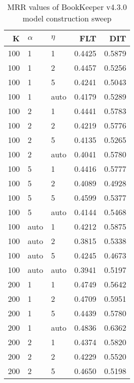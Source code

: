
\begin{table}
\begin{spacing}{1.2}
\centering
\caption{MRR values of BookKeeper v4.3.0 model construction sweep}
\label{table:bookkeeper_model_sweep}
\vspace{0.2em}
\parbox{.45\linewidth}{\centering \begin{tabular}{rll|rr}
\toprule
   K & $\alpha$ &   $\eta$ & FLT & DIT \\
\midrule
 100 &     1 &     1 &           0.4425 & 0.5879 \\
 100 &     1 &     2 &           0.4457 & 0.5256 \\
 100 &     1 &     5 &           0.4241 & 0.5043 \\
 100 &     1 &  auto &           0.4179 & 0.5289 \\
 100 &     2 &     1 &           0.4441 & 0.5783 \\
 100 &     2 &     2 &           0.4219 & 0.5776 \\
 100 &     2 &     5 &           0.4135 & 0.5265 \\
 100 &     2 &  auto &           0.4041 & 0.5780 \\
 100 &     5 &     1 &           0.4416 & 0.5777 \\
 100 &     5 &     2 &           0.4089 & 0.4928 \\
 100 &     5 &     5 &           0.4599 & 0.5377 \\
 100 &     5 &  auto &           0.4144 & 0.5468 \\
 100 &  auto &     1 &           0.4212 & 0.5875 \\
 100 &  auto &     2 &           0.3815 & 0.5338 \\
 100 &  auto &     5 &           0.4245 & 0.4673 \\
 100 &  auto &  auto &           0.3941 & 0.5197 \\
 200 &     1 &     1 &           0.4749 & 0.5642 \\
 200 &     1 &     2 &           0.4709 & 0.5951 \\
 200 &     1 &     5 &           0.4439 & 0.5780 \\
 200 &     1 &  auto &           0.4836 & 0.6362 \\
 200 &     2 &     1 &           0.4374 & 0.5820 \\
 200 &     2 &     2 &           0.4229 & 0.5520 \\
 200 &     2 &     5 &           0.4650 & 0.5198 \\

\end{tabular}}
\end{spacing}
\end{table}

